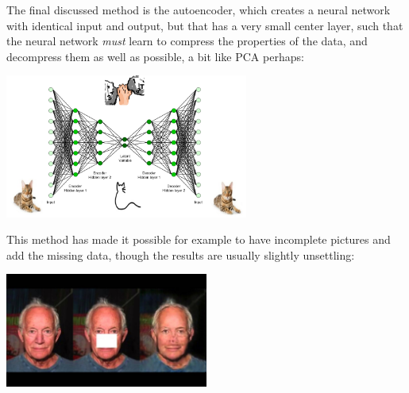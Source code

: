 \documentclass{article}
\begin{document}
\begin{spexample}[Autoencoders]
    The final discussed method is the autoencoder, which creates a neural network with identical input and output, but that has a very small center layer, such that the neural network \textit{must} learn to compress the properties of the data, and decompress them as well as possible, a bit like PCA perhaps:
    \begin{center}\includegraphics[width=0.6\textwidth]{autoencoder_cat.png}\end{center}
    This method has made it possible for example to have incomplete pictures and add the missing data, though the results are usually slightly unsettling:
    \begin{center}\includegraphics[width=0.5\textwidth,trim={0cm 4cm 0cm 4cm},clip]{onemanautoencoder.jpg}\end{center}
\end{spexample}

\end{document}
